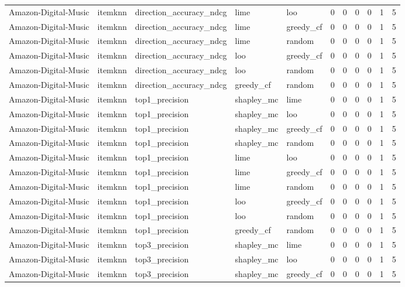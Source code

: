\begin{table}[t]
{\begin{tabular}{lllllrrrrrr}
Amazon-Digital-Music & itemknn & direction\_accuracy\_ndcg & lime & loo & 0 & 0 & 0 & 0 & 1 & 5 \\
Amazon-Digital-Music & itemknn & direction\_accuracy\_ndcg & lime & greedy\_cf & 0 & 0 & 0 & 0 & 1 & 5 \\
Amazon-Digital-Music & itemknn & direction\_accuracy\_ndcg & lime & random & 0 & 0 & 0 & 0 & 1 & 5 \\
Amazon-Digital-Music & itemknn & direction\_accuracy\_ndcg & loo & greedy\_cf & 0 & 0 & 0 & 0 & 1 & 5 \\
Amazon-Digital-Music & itemknn & direction\_accuracy\_ndcg & loo & random & 0 & 0 & 0 & 0 & 1 & 5 \\
Amazon-Digital-Music & itemknn & direction\_accuracy\_ndcg & greedy\_cf & random & 0 & 0 & 0 & 0 & 1 & 5 \\
Amazon-Digital-Music & itemknn & top1\_precision & shapley\_mc & lime & 0 & 0 & 0 & 0 & 1 & 5 \\
Amazon-Digital-Music & itemknn & top1\_precision & shapley\_mc & loo & 0 & 0 & 0 & 0 & 1 & 5 \\
Amazon-Digital-Music & itemknn & top1\_precision & shapley\_mc & greedy\_cf & 0 & 0 & 0 & 0 & 1 & 5 \\
Amazon-Digital-Music & itemknn & top1\_precision & shapley\_mc & random & 0 & 0 & 0 & 0 & 1 & 5 \\
Amazon-Digital-Music & itemknn & top1\_precision & lime & loo & 0 & 0 & 0 & 0 & 1 & 5 \\
Amazon-Digital-Music & itemknn & top1\_precision & lime & greedy\_cf & 0 & 0 & 0 & 0 & 1 & 5 \\
Amazon-Digital-Music & itemknn & top1\_precision & lime & random & 0 & 0 & 0 & 0 & 1 & 5 \\
Amazon-Digital-Music & itemknn & top1\_precision & loo & greedy\_cf & 0 & 0 & 0 & 0 & 1 & 5 \\
Amazon-Digital-Music & itemknn & top1\_precision & loo & random & 0 & 0 & 0 & 0 & 1 & 5 \\
Amazon-Digital-Music & itemknn & top1\_precision & greedy\_cf & random & 0 & 0 & 0 & 0 & 1 & 5 \\
Amazon-Digital-Music & itemknn & top3\_precision & shapley\_mc & lime & 0 & 0 & 0 & 0 & 1 & 5 \\
Amazon-Digital-Music & itemknn & top3\_precision & shapley\_mc & loo & 0 & 0 & 0 & 0 & 1 & 5 \\
Amazon-Digital-Music & itemknn & top3\_precision & shapley\_mc & greedy\_cf & 0 & 0 & 0 & 0 & 1 & 5 \\

\end{tabular}}
\end{table}
